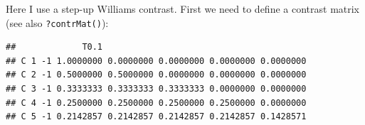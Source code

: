 Here I use a step-up Williams contrast.
First we need to define a contrast matrix (see also \texttt{?contrMat()}):

\begin{knitrout}
\color{fgcolor}\begin{kframe}
\begin{alltt}
 \hlkwb{<-} \hlopt{$}\hlopt{$}
 \hlkwb{<-} 
 \hlkwb{<-} \hlstd{()}
   \hlopt{:} \hlopt{-} \hlstd{)) \{}
   \hlkwb{<-} \hlstd{(}\hlopt{-}\hlstd{, n[}\hlopt{:} \hlopt{+} \hlstd{)]} \hlopt{/} \hlstd{(n[}\hlopt{:} \hlopt{+} \hlstd{)]),} \hlstd{(}  \hlopt{-}  \hlopt{-} \hlstd{))}
   \hlkwb{<-} 
\hlstd{\}}
 \hlkwb{<-} \hlstd{(}\hlstd{,} \hlopt{:}
\end{alltt}
\begin{verbatim}
##             T0.1                                        
## C 1 -1 1.0000000 0.0000000 0.0000000 0.0000000 0.0000000
## C 2 -1 0.5000000 0.5000000 0.0000000 0.0000000 0.0000000
## C 3 -1 0.3333333 0.3333333 0.3333333 0.0000000 0.0000000
## C 4 -1 0.2500000 0.2500000 0.2500000 0.2500000 0.0000000
## C 5 -1 0.2142857 0.2142857 0.2142857 0.2142857 0.1428571
\end{verbatim}
\end{kframe}
\end{knitrout}

